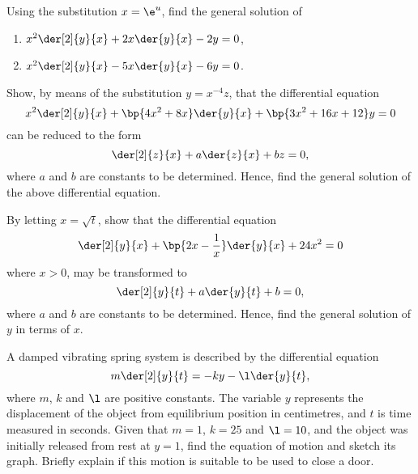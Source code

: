 \begin{problem}
    Using the substitution $x= \e^u$, find the general solution of
    \begin{enumerate}
        \item $x^2 \der[2]{y}{x} + 2x \der{y}{x} - 2y = 0$,
        \item $x^2 \der[2]{y}{x} - 5x \der{y}{x} - 6y = 0$.
    \end{enumerate}
\end{problem}

\begin{problem}
    Show, by means of the substitution $y = x^{-4} z$, that the differential equation \[x^2 \der[2]{y}{x} + \bp{4x^2 + 8x} \der{y}{x} + \bp{3x^2 + 16x + 12} y = 0\] can be reduced to the form \[\der[2]{z}{x} + a\der{z}{x} + bz = 0,\] where $a$ and $b$ are constants to be determined. Hence, find the general solution of the above differential equation.
\end{problem}

\begin{problem}
    By letting $x = \sqrt t$, show that the differential equation \[\der[2]{y}{x} + \bp{2x - \frac1x} \der{y}{x} + 24 x^2 = 0\] where $x > 0$, may be transformed to \[\der[2]{y}{t} + a \der{y}{t} + b = 0,\] where $a$ and $b$ are constants to be determined. Hence, find the general solution of $y$ in terms of $x$.
\end{problem}

\begin{problem}
    A damped vibrating spring system is described by the differential equation \[m \der[2]{y}{t} = -ky - \l \der{y}{t},\] where $m$, $k$ and $\l$ are positive constants. The variable $y$ represents the displacement of the object from equilibrium position in centimetres, and $t$ is time measured in seconds. Given that $m = 1$, $k = 25$ and $\l = 10$, and the object was initially released from rest at $y = 1$, find the equation of motion and sketch its graph. Briefly explain if this motion is suitable to be used to close a door.
\end{problem}

